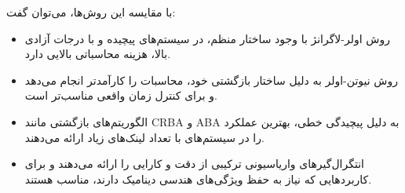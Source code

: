 	با مقایسه این روش‌ها، می‌توان گفت:
	\begin{itemize}
		\item روش اولر-لاگرانژ با وجود ساختار منظم، در سیستم‌های پیچیده و با درجات آزادی بالا، هزینه محاسباتی بالایی دارد.
		\item روش نیوتن-اولر به دلیل ساختار بازگشتی خود، محاسبات را کارآمدتر انجام می‌دهد و برای کنترل زمان واقعی مناسب‌تر است.
		\item الگوریتم‌های بازگشتی مانند CRBA و ABA به دلیل پیچیدگی خطی، بهترین عملکرد را در سیستم‌های با تعداد لینک‌های زیاد ارائه می‌دهند.
		\item انتگرال‌گیرهای واریاسیونی ترکیبی از دقت و کارایی را ارائه می‌دهند و برای کاربردهایی که نیاز به حفظ ویژگی‌های هندسی دینامیک دارند، مناسب هستند.
	\end{itemize}











